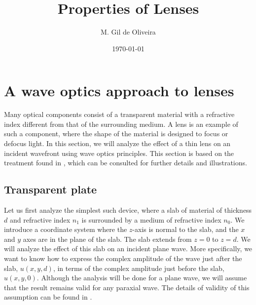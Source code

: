\documentclass[a4paper,10pt]{article}
\title{Properties of Lenses}
\author{M. Gil de Oliveira}
\date{\today}
\begin{document}
\maketitle

\section{A wave optics approach to lenses}

Many optical components consist of a transparent material with a refractive index different from that of the surrounding medium. A lens is an example of such a component, where the shape of the material is designed to focus or defocus light. In this section, we will analyze the effect of a thin lens on an incident wavefront using wave optics principles. This section is based on the treatment found in \cite{saleh2019fundamentals,goodman2017introduction}, which can be consulted for further details and illustrations.

\subsection{Transparent plate}

Let us first analyze the simplest such device, where a slab of material of thickness $d$ and refractive index $n_1$ is surrounded by a medium of refractive index $n_0$. We introduce a coordinate system where the $z$-axis is normal to the slab, and the $x$ and $y$ axes are in the plane of the slab. The slab extends from $z=0$ to $z=d$. We will analyze the effect of this slab on an incident plane wave. More specifically, we want to know how to express the complex amplitude of the wave just after the slab, $u(x,y,d)$, in terms of the complex amplitude just before the slab, $u(x,y,0)$. Although the analysis will be done for a plane wave, we will assume that the result remains valid for any paraxial wave. The details of validity of this assumption can be found in \cite{saleh2019fundamentals}. 
\end{document}

